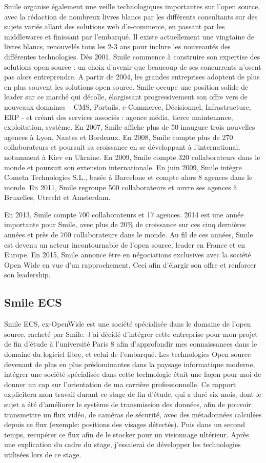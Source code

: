Smile organise également une veille technologiques importantes sur l’open source, avec la
rédaction de nombreux livres blancs par les différents consultants sur des sujets variés allant
des solutions web d’e-commerce, en passant par les middlewares et finissant par
l’embarqué. Il existe actuellement une vingtaine de livres blancs, renouvelés tous les 2-3 ans
pour inclure les nouveautés des différentes technologies.
Dès 2001, Smile commence à construire son expertise des solutions open source : un choix
d’avenir que beaucoup de ses concurrents n’osent pas alors entreprendre.
A partir de 2004, les grandes entreprises adoptent de plus en plus souvent les solutions open
source. Smile occupe une position solide de leader sur ce marché qui décolle, élargissant
progressivement son offre vers de nouveaux domaines – CMS, Portails, e-Commerce,
Décisionnel, Infrastructure, ERP - et créant des services associés : agence média, tierce
maintenance, exploitation, système. En 2007, Smile affiche plus de 50%
inaugure trois nouvelles agences à Lyon, Nantes et Bordeaux.
En 2008, Smile compte plus de 270 collaborateurs et poursuit sa croissance en se
développant à l'international, notamment à Kiev en Ukraine.
En 2009, Smile compte 320 collaborateurs dans le monde et poursuit son extension
internationale. En juin 2009, Smile intègre Cometa Technologies S.L., basée à Barcelone et
compte alors 8 agences dans le monde.
En 2011, Smile regroupe 500 collaborateurs et ouvre ses agences à Bruxelles, Utrecht et
Amsterdam.

En 2013, Smile compte 700 collaborateurs et 17 agences.
2014 est une année importante pour Smile, avec plus de 20\% de croissance sur ces cinq
dernières années et près de 700 collaborateurs dans le monde. Au fil de ces années, Smile est
devenu un acteur incontournable de l’open source, leader en France et en Europe.
En 2015, Smile annonce être en négociations exclusives avec la société Open Wide en vue
d’un rapprochement. Ceci afin d'élargir son offre et renforcer son leadership.


\subsection{Smile ECS}
Smile ECS, ex-OpenWide est une société spécialisée dans le domaine de l'open source, racheté par Smile. J'ai décidé d'intégrer cette entreprise pour mon projet de fin d'étude à l'université Paris 8 afin
d'approfondir mes connaissances dans le domaine du logiciel libre, et celui de l'embarqué.
 Les technologies Open source devenant de plus en plus prédominantes dans la paysage informatique
moderne, intégrer une société spécialisée dans cette technologie était une façon pour
moi de donner un cap sur l'orientation de ma carrière professionnelle.
Ce rapport explicitera mon travail durant ce stage de fin d'étude, qui a duré
six mois, dont le sujet a été d'améliorer le système de transmission des données,
afin de pouvoir transmettre un flux vidéo, de caméras de sécurité, avec des métadonnées
calculées depuis ce flux (exemple: positions des visages détectés). Puis dans un second temps,
recupérer ce flux afin de le stocker pour un visionnage ultérieur.
Après une explication du cadre du stage, j'essaierai de développer les technologies
utilisées lors de ce stage.
